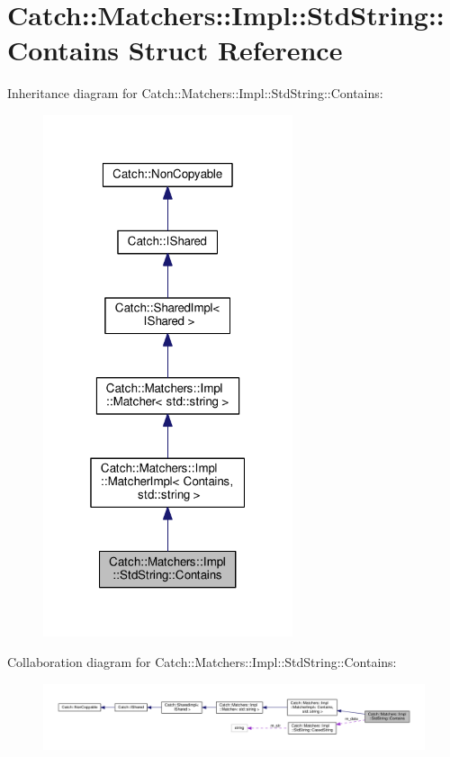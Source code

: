 \hypertarget{structCatch_1_1Matchers_1_1Impl_1_1StdString_1_1Contains}{}\section{Catch\+:\+:Matchers\+:\+:Impl\+:\+:Std\+String\+:\+:Contains Struct Reference}
\label{structCatch_1_1Matchers_1_1Impl_1_1StdString_1_1Contains}


Inheritance diagram for Catch\+:\+:Matchers\+:\+:Impl\+:\+:Std\+String\+:\+:Contains\+:
\nopagebreak
\begin{figure}[H]
\begin{center}
\leavevmode
\includegraphics[width=208pt]{structCatch_1_1Matchers_1_1Impl_1_1StdString_1_1Contains__inherit__graph}
\end{center}
\end{figure}


Collaboration diagram for Catch\+:\+:Matchers\+:\+:Impl\+:\+:Std\+String\+:\+:Contains\+:
\nopagebreak
\begin{figure}[H]
\begin{center}
\leavevmode
\includegraphics[width=350pt]{structCatch_1_1Matchers_1_1Impl_1_1StdString_1_1Contains__coll__graph}
\end{center}
\end{figure}
